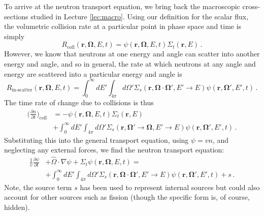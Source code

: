 To arrive at the neutron transport equation, we bring back the macroscopic cross-sections studied in Lecture \ref{lec:macro}.  Using our definition for the scalar flux, the volumetric collision rate at a particular point in phase space and time is simply
\begin{equation}
 R_{\text{coll}}(\mathbf{r},\mathbf{\Omega},E,t) = \psi(\mathbf{r},\mathbf{\Omega},E,t) \Sigma_t(\mathbf{r},E) \, .
\end{equation}
However, we know that neutrons at one energy and angle can scatter into another energy and angle, and so in general, the rate at which neutrons at any angle and energy are scattered into a particular energy and angle is
\begin{equation}
 R_{\text{in-scatter}}(\mathbf{r},\mathbf{\Omega},E,t) = \int^{\infty}_{0} dE' \int_{4\pi} d\Omega' \Sigma_s(\mathbf{r},\mathbf{\Omega}\cdot\mathbf{\Omega}',E'\to E)\psi(\mathbf{r},\mathbf{\Omega'},E',t) \, .
\end{equation}
The time rate of change due to collisions is thus
\begin{equation}
\begin{split}
 \Big( \frac{\partial n}{\partial t} \Big )_{\mathrm{coll}} &= -\psi(\mathbf{r},\mathbf{\Omega},E,t) \Sigma_t(\mathbf{r},E)  \\
  &+ \int^{\infty}_{0} dE' \int_{4\pi} d\Omega' \Sigma_s(\mathbf{r},\mathbf{\Omega}'\to \mathbf{\Omega},E'\to E)\psi(\mathbf{r},\mathbf{\Omega'},E',t) \, .
\end{split}
\end{equation}
Substituting this into the general transport equation, using $\psi = vn$, and neglecting any external forces, we find the neutron transport equation:
\begin{equation}
  \begin{split}
     \frac{1}{v}\frac{\partial \psi}{\partial t} &+ \hat{\Omega} \cdot \nabla \psi + \Sigma_t \psi(\mathbf{r},\mathbf{\Omega},E,t) = \\
           &+ \int^{\infty}_{0} dE' \int_{4\pi} d\Omega' \Sigma_s(\mathbf{r},\mathbf{\Omega}\cdot\mathbf{\Omega}',E'\to E)\psi(\mathbf{r},\mathbf{\Omega'},E',t) +s \, .
  \end{split}
  \label{eq:neutrontransport}
\end{equation}
Note, the source term $s$ has been used to represent internal sources but could also account for other sources such as fission (though the specific form is, of course, hidden).

